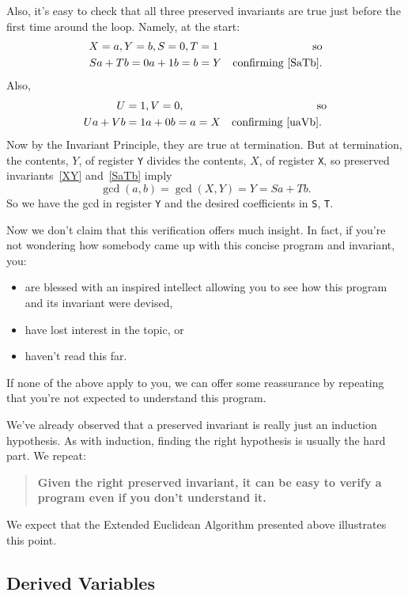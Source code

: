 Also, it's easy to check that all three preserved invariants are true just
before the first time around the loop.  Namely, at the start:
\begin{align*}
X      =a, Y=b,S=0, T& =1 & \mbox{so}\\
Sa+Tb = 0a+1b=b& =Y & \mbox{confirming~\eqref{SaTb}.}
\end{align*}
Also,
\begin{align*}
U     & =1, V=0, & \mbox{so} \\
Ua+Vb & = 1a+0b=a =X & \mbox{confirming~\eqref{uaVb}.  }
\end{align*}
Now by the Invariant Principle, they are true at termination.  But at
termination, the contents, $Y$, of register \texttt{Y} divides the
contents, $X$, of register \texttt{X}, so preserved invariants~\eqref{XY}
and~\eqref{SaTb} imply
\[
\gcd(a,b) = \gcd(X,Y) = Y = Sa + Tb.
\]
So we have the gcd in register \texttt{Y} and the desired coefficients in
\texttt{S}, \texttt{T}.

Now we don't claim that this verification offers much insight.  In fact,
if you're not wondering how somebody came up with this concise program and
invariant, you:
\begin{itemize}

\item are blessed with an inspired intellect allowing you to see how this
  program and its invariant were devised,

\item have lost interest in the topic, or

\item haven't read this far.

\end{itemize}
If none of the above apply to you, we can offer some reassurance by
repeating that you're not expected to understand this program.

We've already observed that a preserved invariant is really just an
induction hypothesis.  As with induction, finding the right hypothesis
is usually the hard part.  We repeat:
\begin{quote}
  \textbf{Given the right preserved invariant, it can be easy to verify a
    program even if you don't understand it.}
\end{quote}
We expect that the Extended Euclidean Algorithm presented above
illustrates this point.
\fi
\iffalse

\subsection{Derived Variables}\label{derived_var_subsec}

